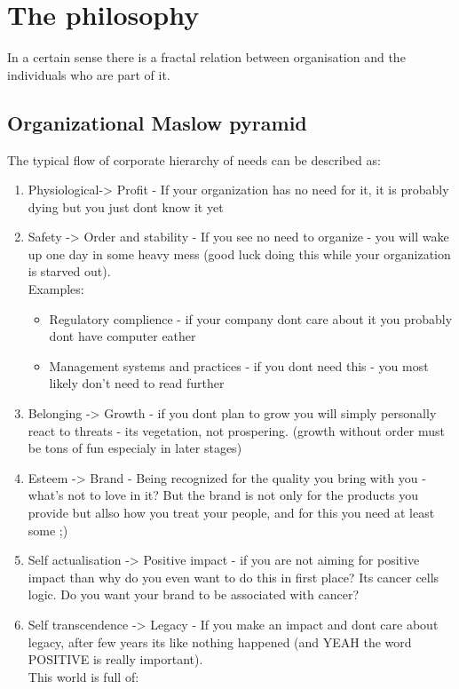 
\section{The philosophy}
In a certain sense there is a fractal relation between organisation and the individuals who are part of it.

\subsection{Organizational Maslow pyramid}


The typical flow of corporate hierarchy of needs can be described as:
\begin{enumerate}
  \item Physiological-> Profit - If your organization has no need for it, it is probably dying but you just dont know it yet
  \item Safety -> Order and stability - If you see no need to organize - you will wake up one day in some heavy mess (good luck doing this while your organization is starved out). \\Examples:
  \begin{itemize}
    \item Regulatory complience - if your company dont care about it you probably dont have computer eather
    \item Management systems and practices - if you dont need this - you most likely don't need to read further
  \end{itemize} 
  \item Belonging -> Growth - if you dont plan to grow you will simply personally react to threats - its vegetation, not prospering. (growth  without order must be tons of fun especialy in later stages)
  \item Esteem -> Brand - Being recognized for the quality you bring with you - what's not to love in it? But the brand is not only for the products you provide but allso how you treat your people, and for this you need at least some ;)
  \item Self actualisation -> Positive impact - if you are not aiming for positive impact than why do you even want to do this in first place? Its cancer cells logic. Do you want your brand to be associated with cancer?
  \item Self transcendence -> Legacy - If you make an impact and dont care about legacy, after few years its like nothing happened (and YEAH the word POSITIVE is really important). \\This world is full of:

\end{enumerate}
